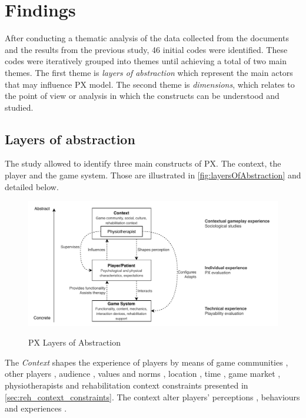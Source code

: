 \section{Findings} %
\label{sec:findings_model}
After conducting a thematic analysis of the data collected from the documents and the results from the previous study, 46 initial codes were identified. These codes were iteratively grouped into themes until achieving a total of two main themes. The first theme is \textit{layers of abstraction} which represent the main actors that may influence \ac{PX} model. The second theme is \textit{dimensions}, which relates to the point of view or analysis in which the constructs can be understood and studied. 

\subsection{Layers of abstraction}
\label{sec:layers_abstraction}
The study allowed to identify three main constructs of \ac{PX}. The context, the player and the game system. Those are illustrated in \autoref{fig:layersOfAbstraction} and detailed below.

\begin{figure}[bth]
\myfloatalign
{\includegraphics[width=\linewidth]{gfx/model/layersOfAbstraction}} \quad
\caption{\ac{PX} Layers of Abstraction}\label{fig:layersOfAbstraction}
\end{figure}

The \textit{Context} shapes the experience of players by means of game communities \autocite{Nacked,Nackea2,Elson2014}, other players \autocite{Nacked,Nackea2,Nackea,DeKort2007b,Elson2014}, audience \autocite{DeKort2007b,Mayra,Nackea2}, values and norms \autocite{Elson2014,Mayra}, location \autocite{Engl2013,Elson2014}, time \autocite{Engl2013}, game market \autocite{Elson2014,Nackea}, physiotherapists and rehabilitation context constraints presented in \autoref{sec:reh_context_constraints}. The context alter players' perceptions \autocite{Nackea2,Nackea}, behaviours and experiences \autocite{Engl2013}.

